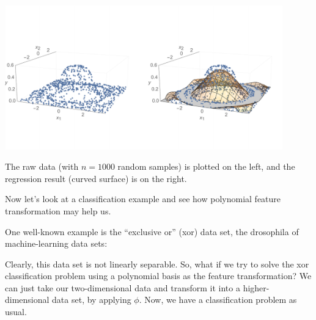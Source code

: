\centerline{\includegraphics[width=0.9\textwidth]{figures/regression_features2_fitsombrero.pdf}}

\noindent
The raw data (with $n=1000$ random samples) is plotted on the left, and the regression result (curved surface) is on the right.


Now let's look at a classification example and see how polynomial feature transformation may help us.

One well-known example is the ``exclusive or'' ({\sc xor}) data set, the drosophila of machine-learning data sets:

\begin{examplebox}
  \begin{center}
  \end{center}
\end{examplebox}

Clearly, this data set is not linearly separable. So, what if we try to solve the {\sc xor} classification problem using a polynomial
basis as the feature transformation?  We can just take our
two-dimensional data and transform it into a higher-dimensional data
set, by applying $\phi$.  Now, we have a classification problem as
usual.

